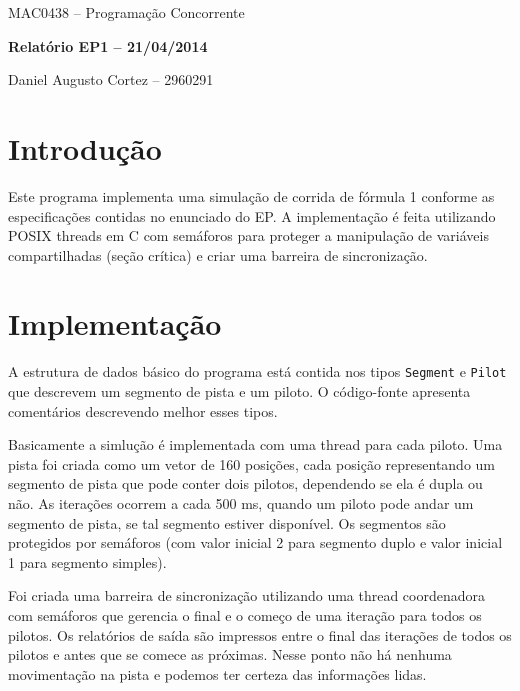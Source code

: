 \documentclass[12pt]{article}
\begin{document}
\begin{center}
	{\large \sc MAC0438 -- Programação Concorrente}

	\vspace{0.2cm}

	{\large \bf Relatório EP1 -- 21/04/2014}

	\vspace{0.5cm}

	{\large Daniel Augusto Cortez -- 2960291}

	\vspace{0.5cm}
\end{center}	


\section{Introdução}

	Este programa implementa uma simulação de corrida de fórmula 1 conforme as especificações 
contidas no enunciado do EP. A implementação é feita utilizando POSIX threads em C com semáforos
para proteger a manipulação de variáveis compartilhadas (seção crítica) e criar uma barreira de
sincronização.


\section{Implementação}

	A estrutura de dados básico do programa está contida nos tipos \verb|Segment| e \verb|Pilot| que 
descrevem um segmento de pista e um piloto. O código-fonte apresenta comentários descrevendo 
melhor esses tipos.

	Basicamente a simlução é implementada com uma thread para cada piloto. Uma pista foi criada 
como um vetor de 160 posições, cada posição representando um segmento de pista que pode conter
dois pilotos, dependendo se ela é dupla ou não. As iterações ocorrem a cada 500 ms, quando um 
piloto pode andar um segmento de pista, se tal segmento estiver disponível. Os segmentos são
protegidos por semáforos (com valor inicial 2 para segmento duplo e valor inicial 1 para 
segmento simples).

	Foi criada uma barreira de sincronização utilizando uma thread coordenadora com semáforos que 
gerencia o final e o começo de uma iteração para todos os pilotos. Os relatórios de saída são 
impressos entre o final das iterações de todos os pilotos e antes que se comece as próximas. 
Nesse ponto não há nenhuma movimentação na pista e podemos ter certeza das informações lidas.
\end{document}
